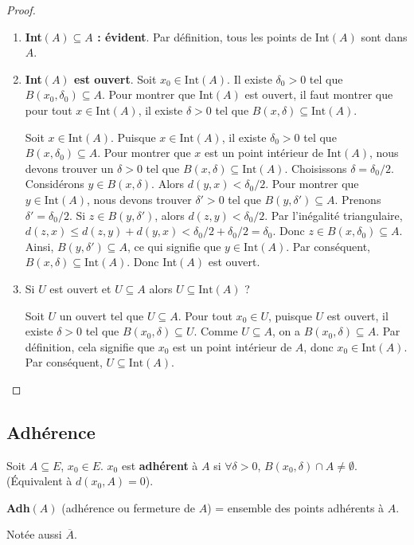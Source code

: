 \documentclass[oneside]{book}
\begin{document}
\begin{proof}
\begin{enumerate}
    \item \textbf{Int$(A) \subseteq A$ : évident}. Par définition, tous les points de Int$(A)$ sont dans $A$.
    \item \textbf{Int$(A)$ est ouvert}. Soit $x_0 \in \text{Int}(A)$. Il existe $\delta_0 > 0$ tel que $B(x_0, \delta_0) \subseteq A$. Pour montrer que Int$(A)$ est ouvert, il faut montrer que pour tout $x \in \text{Int}(A)$, il existe $\delta > 0$ tel que $B(x, \delta) \subseteq \text{Int}(A)$.

    Soit $x \in \text{Int}(A)$. Puisque $x \in \text{Int}(A)$, il existe $\delta_0 > 0$ tel que $B(x, \delta_0) \subseteq A$.
    Pour montrer que $x$ est un point intérieur de $\text{Int}(A)$, nous devons trouver un $\delta > 0$ tel que $B(x, \delta) \subseteq \text{Int}(A)$.
    Choisissons $\delta = \delta_0/2$. Considérons $y \in B(x, \delta)$. Alors $d(y, x) < \delta_0/2$.
    Pour montrer que $y \in \text{Int}(A)$, nous devons trouver $\delta' > 0$ tel que $B(y, \delta') \subseteq A$.
    Prenons $\delta' = \delta_0/2$. Si $z \in B(y, \delta')$, alors $d(z, y) < \delta_0/2$.
    Par l'inégalité triangulaire, $d(z, x) \leq d(z, y) + d(y, x) < \delta_0/2 + \delta_0/2 = \delta_0$.
    Donc $z \in B(x, \delta_0) \subseteq A$. Ainsi, $B(y, \delta') \subseteq A$, ce qui signifie que $y \in \text{Int}(A)$.
    Par conséquent, $B(x, \delta) \subseteq \text{Int}(A)$. Donc Int$(A)$ est ouvert.

    \item Si $U$ est ouvert et $U \subseteq A$ alors $U \subseteq \text{Int}(A)$ ?

    Soit $U$ un ouvert tel que $U \subseteq A$. Pour tout $x_0 \in U$, puisque $U$ est ouvert, il existe $\delta > 0$ tel que $B(x_0, \delta) \subseteq U$. Comme $U \subseteq A$, on a $B(x_0, \delta) \subseteq A$. Par définition, cela signifie que $x_0$ est un point intérieur de $A$, donc $x_0 \in \text{Int}(A)$. Par conséquent, $U \subseteq \text{Int}(A)$.


\end{enumerate}
\end{proof}


\subsection{Adhérence}

\begin{definition}
Soit $A \subseteq E$, $x_0 \in E$. $x_0$ est \textbf{adhérent} à $A$ si $\forall \delta > 0$, $B(x_0, \delta) \cap A \neq \emptyset$. (Équivalent à $d(x_0, A) = 0$).

\textbf{Adh$(A)$} (adhérence ou fermeture de $A$) = ensemble des points adhérents à $A$.

Notée aussi $\overline{A}$.
\end{definition}
\end{document}

